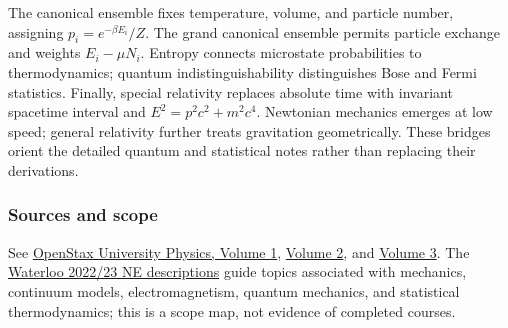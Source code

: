The canonical ensemble fixes temperature, volume, and particle number, assigning $p_i=e^{-\beta E_i}/Z$. The grand canonical ensemble permits particle exchange and weights $E_i-\mu N_i$. Entropy connects microstate probabilities to thermodynamics; quantum indistinguishability distinguishes Bose and Fermi statistics. Finally, special relativity replaces absolute time with invariant spacetime interval and $E^2=p^2c^2+m^2c^4$. Newtonian mechanics emerges at low speed; general relativity further treats gravitation geometrically. These bridges orient the detailed quantum and statistical notes rather than replacing their derivations.

\subsubsection{Sources and scope}
See \href{https://openstax.org/details/books/university-physics-volume-1}{OpenStax University Physics, Volume 1}, \href{https://openstax.org/details/books/university-physics-volume-2}{Volume 2}, and \href{https://openstax.org/details/books/university-physics-volume-3}{Volume 3}. The \href{https://ucalendar.uwaterloo.ca/2223/COURSE/course-NE.html}{Waterloo 2022/23 NE descriptions} guide topics associated with mechanics, continuum models, electromagnetism, quantum mechanics, and statistical thermodynamics; this is a scope map, not evidence of completed courses.